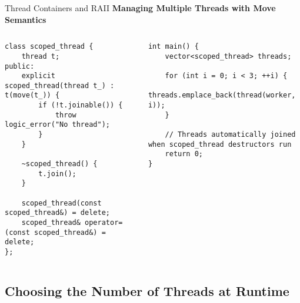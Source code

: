 \begin{frame}[fragile]{Thread Containers and RAII}
	\textbf{Managing Multiple Threads with Move Semantics}

	\begin{columns}
		\begin{column}{0.5\textwidth}
			\begin{verbatim}
class scoped_thread {
    thread t;
public:
    explicit scoped_thread(thread t_) : t(move(t_)) {
        if (!t.joinable()) {
            throw logic_error("No thread");
        }
    }

    ~scoped_thread() {
        t.join();
    }

    scoped_thread(const scoped_thread&) = delete;
    scoped_thread& operator=(const scoped_thread&) = delete;
};
            \end{verbatim}
		\end{column}
		\begin{column}{0.5\textwidth}
			\begin{verbatim}
int main() {
    vector<scoped_thread> threads;

    for (int i = 0; i < 3; ++i) {
        threads.emplace_back(thread(worker, i));
    }

    // Threads automatically joined when scoped_thread destructors run
    return 0;
}
	\end{verbatim}
		\end{column}
	\end{columns}
\end{frame}

\subsection{Choosing the Number of Threads at Runtime}

